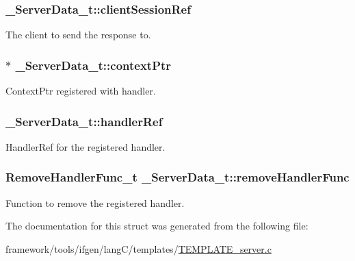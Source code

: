 \subsubsection[{\texorpdfstring{client\+Session\+Ref}{clientSessionRef}}]{ \+\_\+\+Server\+Data\+\_\+t\+::client\+Session\+Ref}\hypertarget{struct___server_data__t_a249518cc694f5a90e7f7aba0f36a8007}{}\label{struct___server_data__t_a249518cc694f5a90e7f7aba0f36a8007}


The client to send the response to. 

\subsubsection[{\texorpdfstring{context\+Ptr}{contextPtr}}]{$\ast$ \+\_\+\+Server\+Data\+\_\+t\+::context\+Ptr}\hypertarget{struct___server_data__t_adac545d725c476ff16a0f523d8c223fc}{}\label{struct___server_data__t_adac545d725c476ff16a0f523d8c223fc}


Context\+Ptr registered with handler. 

\subsubsection[{\texorpdfstring{handler\+Ref}{handlerRef}}]{ \+\_\+\+Server\+Data\+\_\+t\+::handler\+Ref}\hypertarget{struct___server_data__t_a0c61d25f10bcaefdf5be216e27bf5332}{}\label{struct___server_data__t_a0c61d25f10bcaefdf5be216e27bf5332}


Handler\+Ref for the registered handler. 

\subsubsection[{\texorpdfstring{remove\+Handler\+Func}{removeHandlerFunc}}]{\setlength{\rightskip}{0pt plus 5cm}Remove\+Handler\+Func\+\_\+t \+\_\+\+Server\+Data\+\_\+t\+::remove\+Handler\+Func}\hypertarget{struct___server_data__t_afc5193eb95ff130ae30cd1ca2de29520}{}\label{struct___server_data__t_afc5193eb95ff130ae30cd1ca2de29520}


Function to remove the registered handler. 



The documentation for this struct was generated from the following file\+:\begin{DoxyCompactItemize}
\item 
framework/tools/ifgen/lang\+C/templates/\hyperlink{_t_e_m_p_l_a_t_e__server_8c}{T\+E\+M\+P\+L\+A\+T\+E\+\_\+server.\+c}\end{DoxyCompactItemize}
